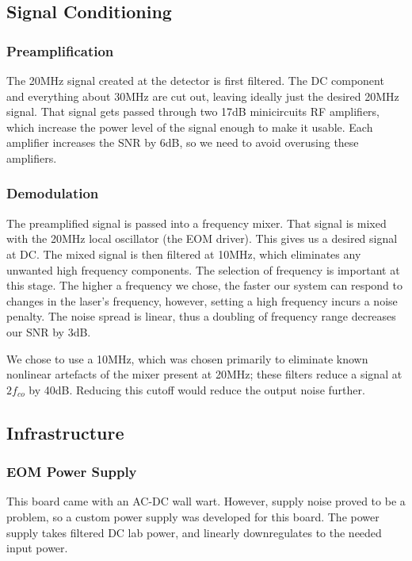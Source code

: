 \subsection{Signal Conditioning}
    \subsubsection{Preamplification}

The 20MHz signal created at the detector is first filtered.  The DC component and everything about 30MHz are cut out, leaving ideally just the desired 20MHz signal.  That signal gets passed through two 17dB minicircuits RF amplifiers, which increase the power level of the signal enough to make it usable.  Each amplifier increases the SNR by 6dB, so we need to avoid overusing these amplifiers.

    \subsubsection{Demodulation}

The preamplified signal is passed into a frequency mixer.  That signal is mixed with the 20MHz local oscillator (the EOM driver).  This gives us a desired signal at DC.  The mixed signal is then filtered at 10MHz, which eliminates any unwanted high frequency components.  The selection of frequency is important at this stage.  The higher a frequency we chose, the faster our system can respond to changes in the laser's frequency, however, setting a high frequency incurs a noise penalty.  The noise spread is linear, thus a doubling of frequency range decreases our SNR by 3dB.

We chose to use a 10MHz, which was chosen primarily to eliminate known nonlinear artefacts of the mixer present at 20MHz; these filters reduce a signal at $2f_{co}$ by 40dB\cite{zfl_1000}.  Reducing this cutoff would reduce the output noise further.
    


\subsection{Infrastructure}
    \subsubsection{EOM Power Supply}

This board came with an AC-DC wall wart.  However, supply noise proved to be a problem, so a custom power supply was developed for this board.  The power supply takes filtered DC lab power, and linearly downregulates to the needed input power.


